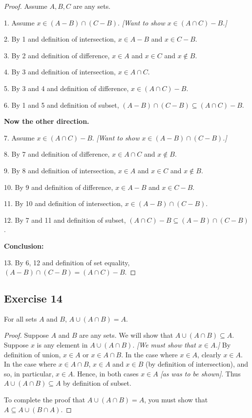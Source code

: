 \documentclass[14pt]{extarticle}
\begin{document}
\begin{proof}
Assume $A,B,C$ are any sets.

1. Assume \(x \in (A - B) \cap (C - B)\). {\it [Want to show \(x \in (A \cap C) - B\).]}

2. By 1 and definition of intersection, \(x \in A - B\) and \(x \in C - B\).

3. By 2 and definition of difference, $x \in A$ and $x \in C$ and $x \notin B$.

4. By 3 and definition of intersection, \(x \in A \cap C\).

5. By 3 and 4 and definition of difference, \(x \in (A \cap C) - B\).

6. By 1 and 5 and definition of subset, \((A - B) \cap (C - B) \subseteq (A \cap C) - B\).

{\bf Now the other direction.}

7. Assume \(x \in (A \cap C) - B\). {\it [Want to show \(x \in (A - B) \cap (C - B)\).]}

8. By 7 and definition of difference, \(x \in A \cap C\) and \(x \notin B\).

9. By 8 and definition of intersection, $x \in A$ and $x \in C$ and $x \notin B$.

10. By 9 and definition of difference, \(x \in A - B\) and \(x \in C - B\).

11. By 10 and definition of intersection, \(x \in (A - B) \cap (C - B)\).

12. By 7 and 11 and definition of subset, \((A \cap C) - B \subseteq (A - B) \cap (C - B)\).

{\bf Conclusion:} 

13. By 6, 12 and definition of set equality, \((A - B) \cap (C - B) = (A \cap C) - B\).
\end{proof}

\subsection{Exercise 14}
For all sets $A$ and $B$, \(A \cup (A \cap B) = A\).

\begin{proof}
Suppose $A$ and $B$ are any sets. We will show that \(A \cup (A \cap B) \subseteq A\). 
Suppose $x$ is any element in \(A \cup (A \cap B)\). {\it [We must show that \(x \in A\).]} By definition of union, 
\(x \in A\) or \(x \in A \cap B\). In the case where \(x \in A\), clearly \(x \in A\). In the case where 
\(x \in A \cap B\), \(x \in A\) and \(x \in B\) (by definition of intersection), and so, in particular, 
\(x \in A\). Hence, in both cases \(x \in A\) {\it [as was to be shown]}. Thus \(A \cup (A \cap B) \subseteq A\) by 
definition of subset.

To complete the proof that \(A \cup (A \cap B) = A\), you must show that \(A \subseteq A \cup (B \cap A)\).
\end{proof}
\end{document}
